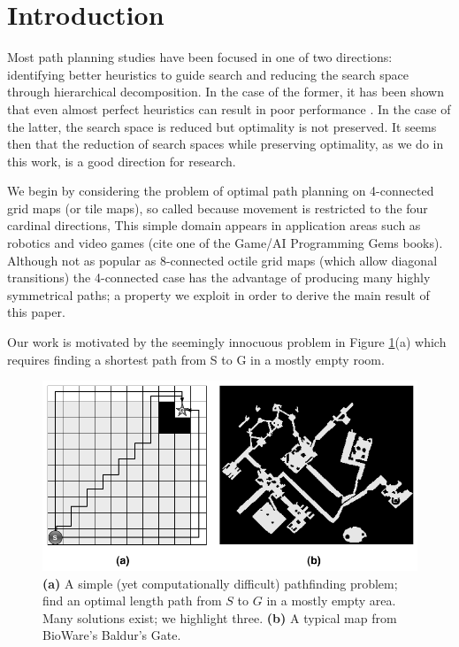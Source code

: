 \section{Introduction}
Most path planning studies have been focused in one of two directions: identifying better heuristics to 
guide search and reducing the search space through hierarchical decomposition.
In the case of the former, it has been shown that even almost perfect heuristics can result in poor 
performance \cite{malte08,korf98}. 
In the case of the latter, the search space is reduced but optimality is not preserved. 
It seems then that the reduction of search spaces while preserving optimality, as we do in this work, is a good direction for research.
\par
We begin by considering the problem of optimal path planning on 4-connected grid maps (or tile maps),
so called because movement is restricted to the four cardinal directions, 
This simple domain appears in application areas such as robotics \cite{latombe91} and video games 
(cite one of the Game/AI Programming Gems books).
Although not as popular as 8-connected octile grid maps (which allow diagonal transitions) the 4-connected case has 
the advantage of producing many highly symmetrical paths; 
a property we exploit in order to derive the main result of this paper.
\par 
Our work is motivated by the seemingly innocuous problem in Figure \ref{fig-emptymap}(a)
which requires finding a shortest path from S to G in a mostly empty room.
\begin{figure}[htbp]
	\vspace{-4pt}
       \begin{center}
                       \includegraphics[scale=0.30, trim = 20mm 20mm 20mm 0mm]{diagrams/emptymap.png}
       \end{center}
	\vspace{-3pt}
       \caption{\textbf{(a)} A simple (yet computationally difficult) pathfinding problem; find an 
optimal length path from $S$ to $G$ in a mostly empty area. 
Many solutions exist; we highlight three. 
\textbf{(b)} A typical map from BioWare's Baldur's Gate.}
       \label{fig-emptymap}
	\vspace{-12pt}
\end{figure}
